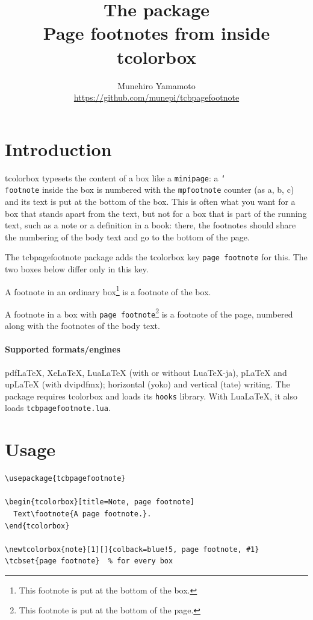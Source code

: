\documentclass{article}
\title{The \pkg{tcbpagefootnote} package\\
  \large Page footnotes from inside tcolorbox}
\author{Munehiro Yamamoto\\
  \url{https://github.com/munepi/tcbpagefootnote}}
\date{\tpfversion}
\newcommand*\cs[1]{\texttt{\char`\\#1}}
\newcommand*\pkg[1]{\textsf{#1}}
\newcommand*\key[1]{\texttt{#1}}
\begin{document}
\maketitle

\section{Introduction}

\pkg{tcolorbox} typesets the content of a box like a \texttt{minipage}:
a \cs{footnote} inside the box is numbered with the \texttt{mpfootnote}
counter (as a, b, c) and its text is put at the bottom of the box.
This is often what you want for a box that stands apart from the text,
but not for a box that is part of the running text, such as a note or
a definition in a book: there, the footnotes should share the numbering
of the body text and go to the bottom of the page.

The \pkg{tcbpagefootnote} package adds the \pkg{tcolorbox} key
\key{page footnote} for this.  The two boxes below differ only in this
key.

\begin{tcolorbox}[title=An ordinary box]
A footnote in an ordinary box\footnote{This footnote is put at the
  bottom of the box.} is a footnote of the box.
\end{tcolorbox}

\begin{tcolorbox}[title=A box with \key{page footnote}, page footnote]
A footnote in a box with \key{page footnote}\footnote{This footnote is
  put at the bottom of the page.} is a footnote of the page, numbered
along with the footnotes of the body text.
\end{tcolorbox}

\paragraph{Supported formats/engines}
pdf\LaTeX, Xe\LaTeX, Lua\LaTeX{} (with or without Lua\TeX-ja),
p\LaTeX{} and up\LaTeX{} (with dvipdfmx); horizontal (yoko) and
vertical (tate) writing.  The package requires \pkg{tcolorbox} and
loads its \texttt{hooks} library.  With Lua\LaTeX, it also loads
\texttt{tcbpagefootnote.lua}.

\section{Usage}

\begin{verbatim}
\usepackage{tcbpagefootnote}

\begin{tcolorbox}[title=Note, page footnote]
  Text\footnote{A page footnote.}.
\end{tcolorbox}

\newtcolorbox{note}[1][]{colback=blue!5, page footnote, #1}
\tcbset{page footnote}  % for every box
\end{verbatim}
\end{document}
